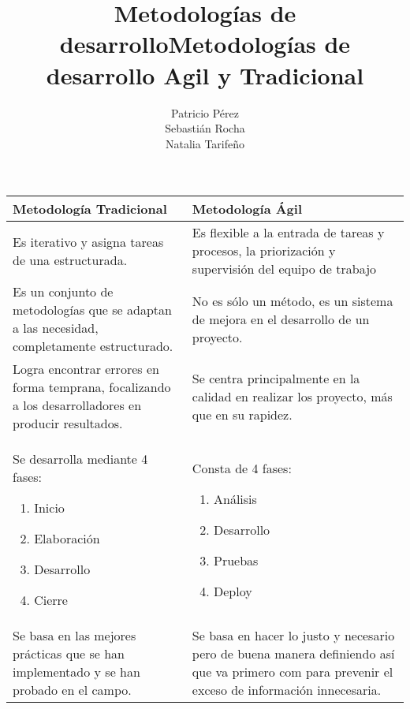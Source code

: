 \documentclass[a4paper,11pt]{report}
\begin{document}
\title{Metodologías de desarrollo}
\author{Patricio Pérez\\
        Sebastián Rocha\\
        Natalia Tarifeño}
\maketitle

\title {Metodologías de desarrollo Agil y Tradicional}
\begin{center}
    \begin{tabular}{ | p{7cm} | p{7cm} |}
    \hline
    Metodología Tradicional & Metodología Ágil \\ \hline
    Es iterativo y asigna tareas de una estructurada. & Es flexible a la entrada de tareas y procesos, la priorización y supervisión del equipo de trabajo \\ \hline
    Es un conjunto de metodologías que se adaptan a las necesidad, completamente estructurado. & No es sólo un método, es un sistema de mejora en el desarrollo de un proyecto. \\ \hline
    Logra encontrar errores en forma temprana, focalizando a los desarrolladores en producir resultados. & Se centra principalmente en la calidad en realizar los proyecto, más que en su rapidez. \\ \hline
    Se desarrolla mediante 4 fases:
    \begin{enumerate}
        \item Inicio
        \item Elaboración
        \item Desarrollo
        \item Cierre
    \end{enumerate} & Consta de 4 fases:
    \begin{enumerate}
        \item Análisis
        \item Desarrollo
        \item Pruebas
        \item Deploy
    \end{enumerate} \\ \hline
    Se basa en las mejores prácticas que se han implementado y se han probado en el campo. & Se basa en hacer lo justo y necesario pero de buena manera definiendo así que va primero com para prevenir el exceso de información innecesaria. \\ \hline

\end{tabular}
\end{center}
\end{document}
